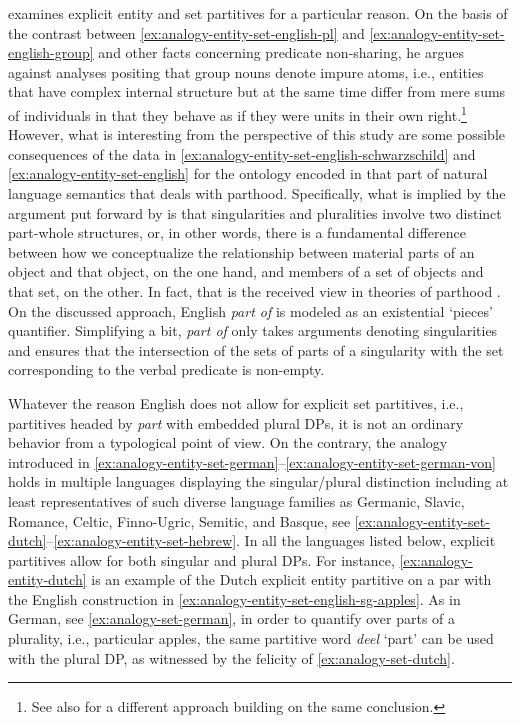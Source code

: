\citeauthor{schwarzschild1996pluralities} examines explicit entity and set partitives for a particular reason. On the basis of the contrast between \ref{ex:analogy-entity-set-english-pl} and \ref{ex:analogy-entity-set-english-group} and other facts concerning predicate non-sharing, he argues against analyses positing that group nouns denote impure atoms, i.e., entities that have complex internal structure but at the same time differ from mere sums of individuals in that they behave as if they were units in their own right.\footnote{See also \citet{de_vries2015shifting} for a different approach building on the same conclusion.} However, what is interesting from the perspective of this study are some possible consequences of the data in \ref{ex:analogy-entity-set-english-schwarzschild} and \ref{ex:analogy-entity-set-english} for the ontology encoded in that part of natural language semantics that deals with parthood. Specifically, what is implied by the argument put forward by \citeauthor{schwarzschild1996pluralities} is that singularities and pluralities involve two distinct part-whole structures, or, in other words, there is a fundamental difference between how we conceptualize the relationship between material parts of an object and that object, on the one hand, and members of a set of objects and that set, on the other. In fact, that is the received view in theories of parthood \citep[e.g.,][]{link1983logical,simons1987parts}. On the discussed approach, English \textit{part of} is modeled as an existential `pieces' quantifier. Simplifying a bit, \textit{part of} only takes arguments denoting singularities and ensures that the intersection of the sets of parts of a singularity with the set corresponding to the verbal predicate is non-empty. 

Whatever the reason English does not allow for explicit set partitives, i.e., partitives headed by \textit{part} with embedded plural DPs, it is not an ordinary behavior from a typological point of view. On the contrary, the analogy introduced in \ref{ex:analogy-entity-set-german}--\ref{ex:analogy-entity-set-german-von} holds in multiple languages displaying the singular/plural distinction including at least representatives of such diverse language families as Germanic, Slavic, Romance, Celtic, Finno-Ugric, Semitic, and Basque, see \ref{ex:analogy-entity-set-dutch}--\ref{ex:analogy-entity-set-hebrew}. In all the languages listed below, explicit partitives allow for both singular and plural DPs. For instance, \ref{ex:analogy-entity-dutch} is an example of the Dutch explicit entity partitive on a par with the English construction in \ref{ex:analogy-entity-set-english-sg-apples}. As in German, see \ref{ex:analogy-set-german}, in order to quantify over parts of a plurality, i.e., particular apples, the same partitive word \textit{deel} `part' can be used with the plural DP, as witnessed by the felicity of \ref{ex:analogy-set-dutch}. 

